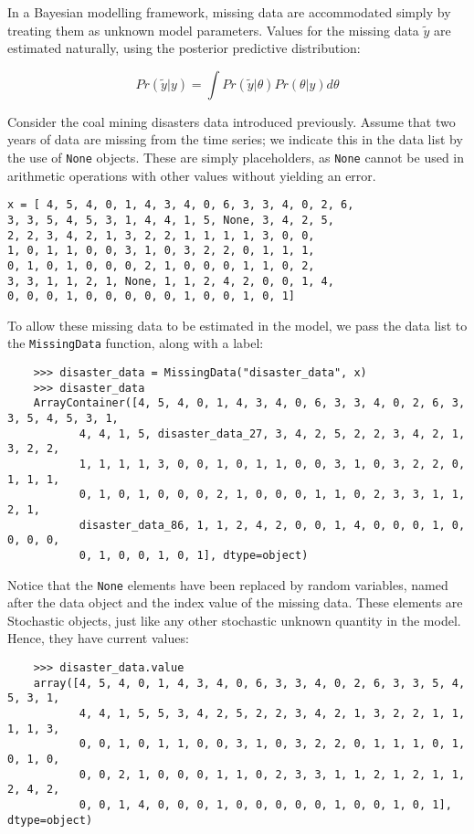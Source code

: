 In a Bayesian modelling framework, missing data are accommodated simply by treating them as unknown model parameters. Values for the missing data $\tilde{y}$ are estimated naturally, using the posterior predictive distribution:

\begin{equation}
	Pr(\tilde{y}|y) = \int Pr(\tilde{y}|\theta) Pr(\theta|y) d\theta
\end{equation}

Consider the coal mining disasters data introduced previously. Assume that two years of data are missing from the time series; we indicate this in the data list by the use of \texttt{None} objects. These are simply placeholders, as \texttt{None} cannot be used in arithmetic operations with other values without yielding an error.

\begin{verbatim}
x = [ 4, 5, 4, 0, 1, 4, 3, 4, 0, 6, 3, 3, 4, 0, 2, 6,
3, 3, 5, 4, 5, 3, 1, 4, 4, 1, 5, None, 3, 4, 2, 5,
2, 2, 3, 4, 2, 1, 3, 2, 2, 1, 1, 1, 1, 3, 0, 0,
1, 0, 1, 1, 0, 0, 3, 1, 0, 3, 2, 2, 0, 1, 1, 1,
0, 1, 0, 1, 0, 0, 0, 2, 1, 0, 0, 0, 1, 1, 0, 2,
3, 3, 1, 1, 2, 1, None, 1, 1, 2, 4, 2, 0, 0, 1, 4,
0, 0, 0, 1, 0, 0, 0, 0, 0, 1, 0, 0, 1, 0, 1]
\end{verbatim}

To allow these missing data to be estimated in the model, we pass the data list to the \texttt{MissingData} function, along with a label:

\begin{verbatim}
	>>> disaster_data = MissingData("disaster_data", x)
	>>> disaster_data
	ArrayContainer([4, 5, 4, 0, 1, 4, 3, 4, 0, 6, 3, 3, 4, 0, 2, 6, 3, 3, 5, 4, 5, 3, 1,
	       4, 4, 1, 5, disaster_data_27, 3, 4, 2, 5, 2, 2, 3, 4, 2, 1, 3, 2, 2,
	       1, 1, 1, 1, 3, 0, 0, 1, 0, 1, 1, 0, 0, 3, 1, 0, 3, 2, 2, 0, 1, 1, 1,
	       0, 1, 0, 1, 0, 0, 0, 2, 1, 0, 0, 0, 1, 1, 0, 2, 3, 3, 1, 1, 2, 1,
	       disaster_data_86, 1, 1, 2, 4, 2, 0, 0, 1, 4, 0, 0, 0, 1, 0, 0, 0, 0,
	       0, 1, 0, 0, 1, 0, 1], dtype=object)
\end{verbatim}

Notice that the \texttt{None} elements have been replaced by random variables, named after the data object and the index value of the missing data. These elements are Stochastic objects, just like any other stochastic unknown quantity in the model. Hence, they have current values:

\begin{verbatim}
	>>> disaster_data.value
	array([4, 5, 4, 0, 1, 4, 3, 4, 0, 6, 3, 3, 4, 0, 2, 6, 3, 3, 5, 4, 5, 3, 1,
	       4, 4, 1, 5, 5, 3, 4, 2, 5, 2, 2, 3, 4, 2, 1, 3, 2, 2, 1, 1, 1, 1, 3,
	       0, 0, 1, 0, 1, 1, 0, 0, 3, 1, 0, 3, 2, 2, 0, 1, 1, 1, 0, 1, 0, 1, 0,
	       0, 0, 2, 1, 0, 0, 0, 1, 1, 0, 2, 3, 3, 1, 1, 2, 1, 2, 1, 1, 2, 4, 2,
	       0, 0, 1, 4, 0, 0, 0, 1, 0, 0, 0, 0, 0, 1, 0, 0, 1, 0, 1], dtype=object)
\end{verbatim}

